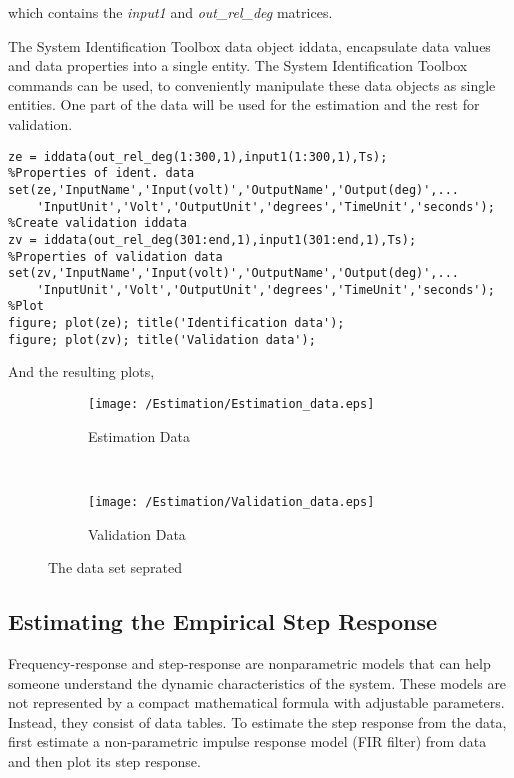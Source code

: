 \noindent which contains the \textit{input1} and \textit{out\_rel\_deg} matrices.


The System Identification Toolbox data object iddata, encapsulate data values and data properties into a single entity. The System Identification Toolbox commands can be used, to conveniently manipulate these data objects as single entities. One part of the data will be used for the estimation and the rest for validation.

\begin{lstlisting}[style=My_MATLAB, caption=Creating iddata]
%Create identification iddata
ze = iddata(out_rel_deg(1:300,1),input1(1:300,1),Ts);
%Properties of ident. data
set(ze,'InputName','Input(volt)','OutputName','Output(deg)',...
    'InputUnit','Volt','OutputUnit','degrees','TimeUnit','seconds');
%Create validation iddata
zv = iddata(out_rel_deg(301:end,1),input1(301:end,1),Ts);
%Properties of validation data
set(zv,'InputName','Input(volt)','OutputName','Output(deg)',...
    'InputUnit','Volt','OutputUnit','degrees','TimeUnit','seconds');
%Plot
figure; plot(ze); title('Identification data');
figure; plot(zv); title('Validation data');
\end{lstlisting}

\noindent And the resulting plots,

\begin{figure}[h!]
    \centering

    \begin{subfigure}[h]{0.45\textwidth}
        \texttt{[image: /Estimation/Estimation\_data.eps]}
        \caption{Estimation Data}
        \label{Fig:estimation_data}
    \end{subfigure}
    ~
    \begin{subfigure}[h]{0.45\textwidth}
        \texttt{[image: /Estimation/Validation\_data.eps]}
        \caption{Validation Data}
        \label{Fig:validation data}
    \end{subfigure}
    
    
    \caption{The data set seprated}\label{Fig:seperated_data}
\end{figure}


\subsection{Estimating the Empirical Step Response}

Frequency-response and step-response are nonparametric models that can help someone understand the dynamic characteristics of the system. These models are not represented by a compact mathematical formula with adjustable parameters. Instead, they consist of data tables. To estimate the step response from the data, first estimate a non-parametric impulse response model (FIR filter) from data and then plot its step response.

